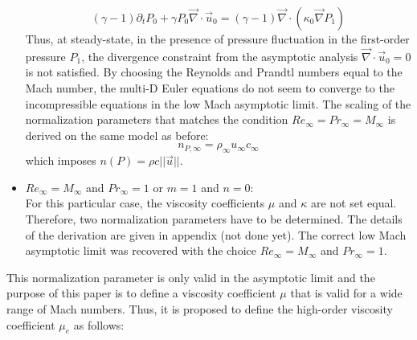 \documentclass[preprint,10pt]{elsarticle}
\renewcommand{\div}{\vec{\nabla}\! \cdot \!}
\newcommand{\grad}{\vec{\nabla}}
\newcommand{\eqt}[1]{Eq.~(\ref{#1})}                     %
\begin{document}
\begin{itemize}
\begin{equation}
(\gamma-1) \partial_t P_0 + \gamma P_0 \div \vec{u}_0 = (\gamma-1) \div \left( \kappa_0 \grad P_1 \right)
\end{equation}
Thus, at steady-state, in the presence of pressure fluctuation in the first-order pressure $P_1$, the divergence constraint from the asymptotic analysis $\div \vec{u}_0=0$ is not satisfied. By choosing the Reynolds and Prandtl numbers equal to the Mach number, the multi-D Euler equations do not seem to converge to the incompressible equations in the low Mach asymptotic limit. The scaling of the normalization parameters that matches the condition $Re_{\infty} = Pr_{\infty} = M_{\infty}$ is derived on the same model as before:
\begin{equation}
\label{eq:norm_relation_bis2}
n_{P,\infty} = \rho_{\infty} u_{\infty} c_{\infty} 
\end{equation}
which imposes $n(P) = \rho c || \vec{u} ||$.
\item $Re_{\infty} = M_{\infty}$ and $Pr_{\infty} = 1$ or $m=1$ and $n=0$:\\
For this particular case, the viscosity coefficients $\mu$ and $\kappa$ are not set equal. Therefore, two normalization parameters have to be determined. The details of the derivation are given in appendix (not done yet). The correct low Mach asymptotic limit was recovered with the choice $Re_{\infty} = M_{\infty}$ and $Pr_{\infty} = 1$.
\end{itemize}
This normalization parameter is only valid in the asymptotic limit and the purpose of this paper is to define a viscosity coefficient $\mu$ that is valid for a wide range of Mach numbers. Thus, it is proposed to define the high-order viscosity coefficient $\mu_e$ as follows:
\end{document}
